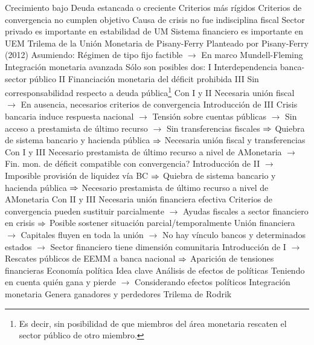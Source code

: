 \documentclass{nuevotema}
\begin{document}
\begin{esquemal}
				\4[] Crecimiento bajo
				\4[] Deuda estancada o creciente
				\4[] Criterios más rígidos
				\4[$\then$] Criterios de convergencia no cumplen objetivo
				\4[$\then$] Causa de crisis no fue indisciplina fiscal
				\4[$\then$] Sector privado es importante en estabilidad de UM
				\4[$\then$] Sistema financiero es importante en UEM
			\3 Trilema de la Unión Monetaria de Pisany-Ferry
				\4 Planteado por Pisany-Ferry (2012)
				\4 Asumiendo:
				\4[] Régimen de tipo fijo factible
				\4[] $\to$ En marco Mundell-Fleming
				\4[] Integración monetaria avanzada
				\4 Sólo son posibles dos:
				\4[] \textsc{I} Interdependencia banca-sector público
				\4[] \textsc{II} Financiación monetaria del déficit prohibida
				\4[] \textsc{III} Sin corresponsabilidad respecto a deuda pública\footnote{Es decir, sin posibilidad de que miembros del área monetaria rescaten el sector público de otro miembro.}
				\4 Con I y II
				\4[] Necesaria unión fiscal
				\4[] $\to$ En ausencia, necesarios criterios de convergencia
				\4[] Introducción de III
				\4[] Crisis bancaria induce respuesta nacional
				\4[] $\to$ Tensión sobre cuentas públicas
				\4[] $\to$ Sin acceso a prestamista de último recurso
				\4[] $\to$ Sin transferencias fiscales
				\4[] $\then$ Quiebra de sistema bancario y hacienda pública
				\4[] $\then$ Necesaria unión fiscal y transferencias
				\4 Con I y III
				\4[] Necesario prestamista de último recurso a nivel de AMonetaria
				\4[] $\to$ Fin. mon. de déficit compatible con convergencia?
				\4[] Introducción de II
				\4[] $\to$ Imposible provisión de liquidez vía BC
				\4[] $\then$ Quiebra de sistema bancario y hacienda pública
				\4[] $\then$ Necesario prestamista de último recurso a nivel de AMonetaria
				\4 Con II y III
				\4[] Necesaria unión financiera efectiva
				\4[] Criterios de convergencia pueden sustituir parcialmente
				\4[] $\to$ Ayudas fiscales a sector financiero en crisis
				\4[] $\then$ Posible sostener situación parcial/temporalmente
				\4[] Unión financiera
				\4[] $\to$ Capitales fluyen en toda la unión
				\4[] $\to$ No hay vínculo bancos y determinados estados
				\4[] $\to$ Sector financiero tiene dimensión comunitaria
				\4[] Introducción de I
				\4[] $\to$ Rescates públicos de EEMM a banca nacional
				\4[] $\then$ Aparición de tensiones financieras
		\2 Economía política
			\3 Idea clave
				\4 Análisis de efectos de políticas
				\4[] Teniendo en cuenta quién gana y pierde
				\4[] $\to$ Considerando efectos políticos
				\4 Integración monetaria
				\4[] Genera ganadores y perdedores
			\3 Trilema de Rodrik

\end{esquemal}
\end{document}
